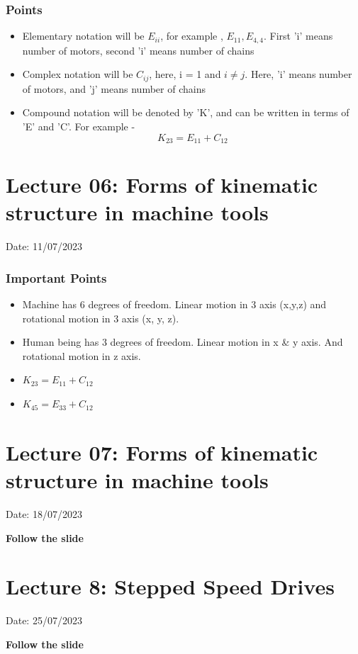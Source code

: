 \documentclass{article}
\begin{document}
\subsubsection*{Points}
\begin{itemize}
  \item Elementary notation will be $E_{ii}$, for example , $E_{11}, E_{4,4}$. First 'i' means number of motors, second 'i' means number of chains 
  \item Complex notation will be $C_{ij}$, here, i = 1 and $i \neq j$. Here, 'i' means number of motors, and 'j' means number of chains 
  \item Compound notation will be denoted by 'K', and can be written in terms of 'E' and 'C'. For example - 
  $$K_{23} = E_{11} + C_{12}$$
\end{itemize}
\hrulefill

\section{Lecture 06: Forms of kinematic structure in machine tools} 
\hfill Date: 11/07/2023

\subsubsection*{Important Points}
\begin{itemize}
  \item Machine has 6 degrees of freedom. Linear motion in 3 axis (x,y,z) and rotational motion in 3 axis (x, y, z). 
  \item Human being has 3 degrees of freedom. Linear motion in x \& y axis. And rotational motion in z axis. 
  \item $K_{23} = E_{11} + C_{12}$ 
  \item $K_{45} = E_{33} + C_{12}$ 
\end{itemize}

\section{Lecture 07: Forms of kinematic structure in machine tools} 
\hfill Date: 18/07/2023

\textbf{Follow the slide}
\hrulefill

\section{Lecture 8: Stepped Speed Drives} 
\hfill Date: 25/07/2023

\textbf{Follow the slide}
\hrulefill
\end{document}
